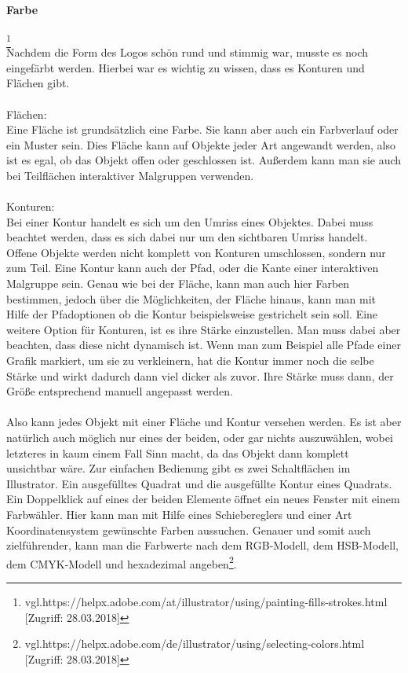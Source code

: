 \paragraph{Farbe}
\footnote{\label{} vgl.https://helpx.adobe.com/at/illustrator/using/painting-fills-strokes.html [Zugriff: 28.03.2018]}
\leavevmode \\
Nachdem die Form des Logos schön rund und stimmig war, musste es noch eingefärbt werden. Hierbei war es wichtig zu wissen, dass es Konturen und Flächen gibt.
\leavevmode \\
\leavevmode \\
Flächen:
\leavevmode \\
Eine Fläche ist grundsätzlich eine Farbe. Sie kann aber auch ein Farbverlauf oder ein Muster sein. Dies Fläche kann auf Objekte jeder Art angewandt werden, also ist es egal, ob das Objekt offen oder geschlossen ist. Außerdem kann man sie auch bei Teilflächen interaktiver Malgruppen verwenden.
\leavevmode \\
\leavevmode \\
Konturen:
\leavevmode \\
Bei einer Kontur handelt es sich um den Umriss eines Objektes. Dabei muss beachtet werden, dass es sich dabei nur um den sichtbaren Umriss handelt. Offene Objekte werden nicht komplett von Konturen umschlossen, sondern nur zum Teil. Eine Kontur kann auch der Pfad, oder die Kante einer interaktiven Malgruppe sein. Genau wie bei der Fläche, kann man auch hier Farben bestimmen, jedoch über die Möglichkeiten, der Fläche hinaus, kann man mit Hilfe der Pfadoptionen ob die Kontur beispielsweise gestrichelt sein soll. Eine weitere Option für Konturen, ist es ihre Stärke einzustellen. Man muss dabei aber beachten, dass diese nicht dynamisch ist. Wenn man zum Beispiel alle Pfade einer Grafik markiert, um sie zu verkleinern, hat die Kontur immer noch die selbe Stärke und wirkt dadurch dann viel dicker als zuvor. Ihre Stärke muss dann, der Größe entsprechend manuell angepasst werden.
\leavevmode \\
\leavevmode \\
Also kann jedes Objekt mit einer Fläche und Kontur versehen werden. Es ist aber natürlich auch möglich nur eines der beiden, oder gar nichts auszuwählen, wobei letzteres in kaum einem Fall Sinn macht, da das Objekt dann komplett unsichtbar wäre. Zur einfachen Bedienung gibt es zwei Schaltflächen im Illustrator. Ein ausgefülltes Quadrat und die ausgefüllte Kontur eines Quadrats. Ein Doppelklick auf eines der beiden Elemente öffnet ein neues Fenster mit einem Farbwähler. Hier kann man mit Hilfe eines Schiebereglers und einer Art Koordinatensystem gewünschte Farben aussuchen. Genauer und somit auch zielführender, kann man die Farbwerte nach dem RGB-Modell, dem HSB-Modell, dem CMYK-Modell und hexadezimal angeben\footnote{\label{} vgl.https://helpx.adobe.com/de/illustrator/using/selecting-colors.html [Zugriff: 28.03.2018]}.
